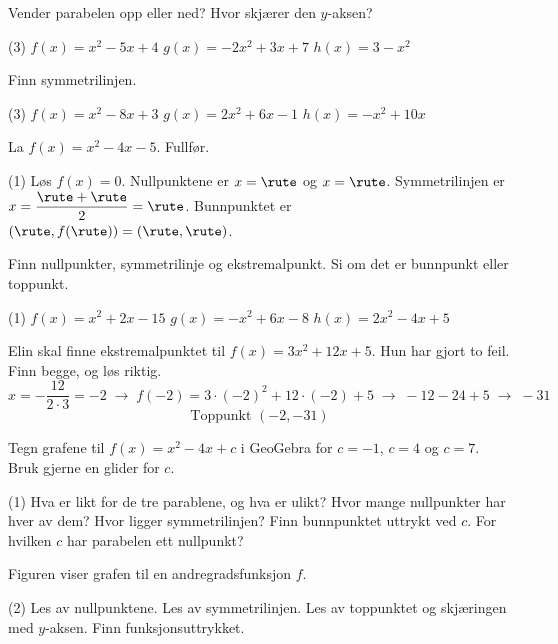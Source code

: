 
Vender parabelen opp eller ned? Hvor skjærer den $y$-aksen?
\begin{tasks}(3)
  \task $f(x) = x^2 - 5x + 4$
  \task $g(x) = -2x^2 + 3x + 7$
  \task $h(x) = 3 - x^2$
\end{tasks}

Finn symmetrilinjen.
\begin{tasks}(3)
  \task $f(x) = x^2 - 8x + 3$
  \task $g(x) = 2x^2 + 6x - 1$
  \task $h(x) = -x^2 + 10x$
\end{tasks}

La $f(x) = x^2 - 4x - 5$. Fullfør.
\begin{tasks}(1)
  \task Løs $f(x) = 0$. Nullpunktene er $x = \rute$ og $x = \rute$.
  \task Symmetrilinjen er $x = \dfrac{\rute + \rute}{2} = \rute$.
  \task Bunnpunktet er $(\rute, f(\rute)) = (\rute, \rute)$.
\end{tasks}


Finn nullpunkter, symmetrilinje og ekstremalpunkt. Si om det er bunnpunkt eller toppunkt.
\begin{tasks}(1)
  \task $f(x) = x^2 + 2x - 15$
  \task $g(x) = -x^2 + 6x - 8$
  \task $h(x) = 2x^2 - 4x + 5$
\end{tasks}

Elin skal finne ekstremalpunktet til $f(x) = 3x^2 + 12x + 5$. Hun har gjort to feil. Finn begge, og løs riktig.
\[ x = -\frac{12}{2\cdot 3} = -2 \;\longrightarrow\; f(-2) = 3\cdot(-2)^2 + 12\cdot(-2) + 5 \;\longrightarrow\; -12 - 24 + 5 \;\longrightarrow\; -31 \]
\[ \text{Toppunkt } (-2, -31) \]

Tegn grafene til $f(x) = x^2 - 4x + c$ i GeoGebra for $c = -1$, $c = 4$ og $c = 7$. Bruk gjerne en glider for $c$.
\begin{tasks}(1)
  \task Hva er likt for de tre parablene, og hva er ulikt? Hvor mange nullpunkter har hver av dem?
  \task Hvor ligger symmetrilinjen? Finn bunnpunktet uttrykt ved $c$.
  \task For hvilken $c$ har parabelen ett nullpunkt?
\end{tasks}

Figuren viser grafen til en andregradsfunksjon $f$.
\begin{center}
\end{center}
\begin{tasks}(2)
  \task Les av nullpunktene.
  \task Les av symmetrilinjen.
  \task Les av toppunktet og skjæringen med $y$-aksen.
  \task Finn funksjonsuttrykket.
\end{tasks}

